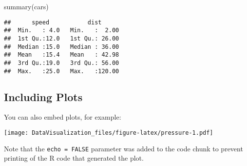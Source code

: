 \documentclass[
]{article}
\newenvironment{Shaded}{\begin{snugshade}}{\end{snugshade}}
\newcommand{\FunctionTok}[1]{\textcolor[rgb]{0.00,0.00,0.00}{#1}}
\newcommand{\NormalTok}[1]{#1}
\begin{document}
\begin{Shaded}
\begin{Highlighting}[]
\FunctionTok{summary}\NormalTok{(cars)}
\end{Highlighting}
\end{Shaded}

\begin{verbatim}
##      speed           dist       
##  Min.   : 4.0   Min.   :  2.00  
##  1st Qu.:12.0   1st Qu.: 26.00  
##  Median :15.0   Median : 36.00  
##  Mean   :15.4   Mean   : 42.98  
##  3rd Qu.:19.0   3rd Qu.: 56.00  
##  Max.   :25.0   Max.   :120.00
\end{verbatim}

\hypertarget{including-plots}{%
\subsection{Including Plots}\label{including-plots}}

You can also embed plots, for example:

\texttt{[image: DataVisualization\_files/figure-latex/pressure-1.pdf]}

Note that the \texttt{echo\ =\ FALSE} parameter was added to the code
chunk to prevent printing of the R code that generated the plot.
\end{document}
